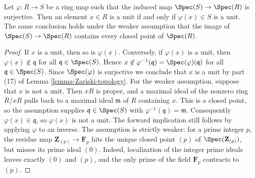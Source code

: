 \begin{lemma}
\label{lemma-surjective-on-spec-units}
Let $\varphi : R \to S$ be a ring map such that the induced map
$\Spec(S) \to \Spec(R)$ is surjective. Then an element $x \in R$
is a unit if and only if $\varphi(x) \in S$ is a unit.
The same conclusion holds under the weaker assumption that the image
of $\Spec(S)\to\Spec(R)$ contains every closed point of $\Spec(R)$.
\end{lemma}

\begin{proof}
If $x$ is a unit, then so is $\varphi(x)$. Conversely, if $\varphi(x)$
is a unit, then $\varphi(x) \not \in \mathfrak q$ for all
$\mathfrak q \in \Spec(S)$. Hence
$x \not \in \varphi^{-1}(\mathfrak q) = \Spec(\varphi)(\mathfrak q)$
for all $\mathfrak q \in \Spec(S)$. Since $\Spec(\varphi)$ is surjective
we conclude that $x$ is a unit by
part (17) of Lemma \ref{lemma-Zariski-topology}.
For the weaker assumption, suppose that $x$ is not a unit.
Then $xR$ is proper, and a maximal ideal of the nonzero ring $R/xR$
pulls back to a maximal ideal $\mathfrak m$ of $R$ containing $x$.
This is a closed point, so the assumption supplies
$\mathfrak q\in\Spec(S)$ with
$\varphi^{-1}(\mathfrak q)=\mathfrak m$.
Consequently $\varphi(x)\in\mathfrak q$, so $\varphi(x)$ is not a unit.
The forward implication still follows by applying $\varphi$ to an inverse.
The assumption is strictly weaker: for a prime integer $p$, the residue map
$\mathbf Z_{(p)}\to\mathbf F_p$ hits the unique closed point $(p)$
of $\Spec(\mathbf Z_{(p)})$, but misses its prime ideal $(0)$.
Indeed, localization of the integer prime ideals leaves exactly $(0)$
and $(p)$, and the only prime of the field $\mathbf F_p$ contracts to $(p)$.
\end{proof}